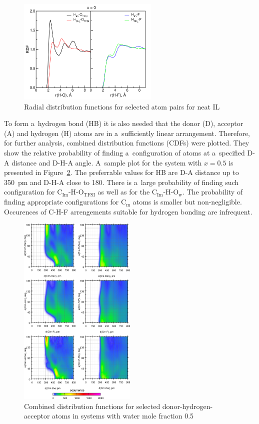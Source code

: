 \begin{figure}
    \centering
    \includegraphics[width=0.6\textwidth]{img/3-structural-data-from-md-simulations/6-il-h2o/rdf-0.0.png}
    \caption{Radial distribution functions for selected atom pairs for neat IL}
    \label{fig:il-h2o-rdf-0.0}
\end{figure}

To form a~hydrogen bond (HB) it is also needed that the donor (D), acceptor (A) and hydrogen (H) atoms are in a~sufficiently linear arrangement. Therefore, for further analysis, combined distribution functions (CDFs) were plotted. They show the relative probability of finding a~configuration of atoms at a~specified D-A distance and D-H-A angle. A~sample plot for the system with $x = 0.5$ is presented in Figure~\ref{fig:il-h2o-cdf}. The preferrable values for HB are D-A distance up to 350~pm and D-H-A close to 180{\degree}. There is a~large probability of finding such configuration for C$_{\text{Im}}$-H-O$_{\text{TFSI}}$ as well as for the C$_{\text{Im}}$-H-O$_{\text{w}}$. The probability of finding appropriate configurations for C${_{\text{m}}}$ atoms is smaller but non-negligible. Occurences of C-H-F arrengements suitable for hydrogen bonding are infrequent.

\begin{figure}[ht]
    \centering
    \includegraphics[width=0.50\textwidth]{img/3-structural-data-from-md-simulations/6-il-h2o/cdf-0.5.png}
    \caption{Combined distribution functions for selected donor-hydrogen-acceptor atoms in systems with water mole fraction 0.5}
    \label{fig:il-h2o-cdf}
\end{figure}

